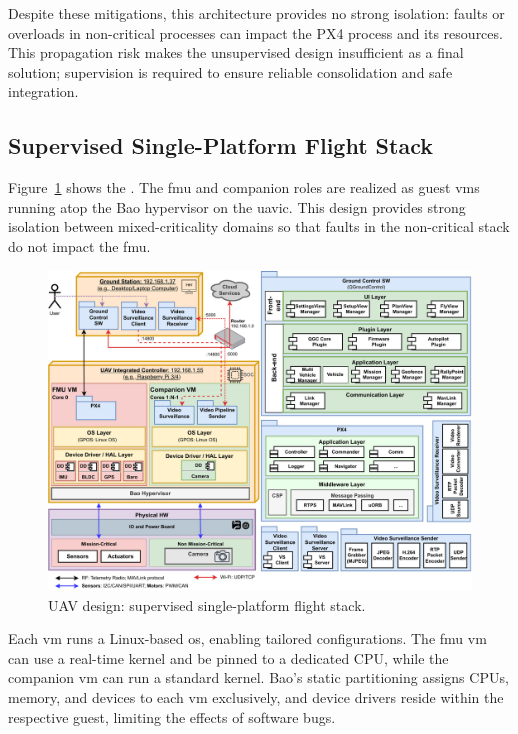 Despite these mitigations, this architecture provides no strong isolation: faults
or overloads in non-critical processes can impact the PX4 process and its
resources. This propagation risk makes the unsupervised design insufficient as a
final solution; supervision is required to ensure reliable consolidation and
safe integration.

\subsection{Supervised Single-Platform Flight Stack}
\label{sec:superv-stack}

Figure~\ref{fig:uav-design-sup} shows the . The \gls{fmu} and
companion roles are realized as guest \glspl{vm} running atop the Bao
hypervisor on the \gls{uavic}. This design provides strong isolation between
mixed-criticality domains so that faults in the non-critical stack do not impact
the \gls{fmu}.

\begin{figure}[!hbt]
  \centering
  \includegraphics[width=1.0\textwidth]{./img/pdf/uav-main-design-sup.pdf}
  \caption{UAV design: supervised single-platform flight stack.}
  \label{fig:uav-design-sup}
\end{figure}

Each \gls{vm} runs a Linux-based \gls{os}, enabling tailored configurations. The
\gls{fmu} \gls{vm} can use a real-time kernel and be pinned to a dedicated CPU,
while the companion \gls{vm} can run a standard kernel. Bao’s static
partitioning assigns CPUs, memory, and devices to each \gls{vm} exclusively,
and device drivers reside within the respective guest, limiting the effects
of software bugs.

